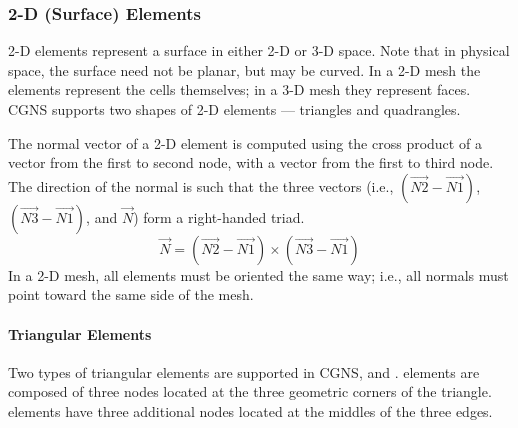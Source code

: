 {{{\subsubsection{2-D (Surface) Elements}
\label{s:unstructgrid_2d}

2-D elements represent a surface in either 2-D or 3-D space.
Note that in physical space, the surface need not be planar, but
may be curved.
In a 2-D mesh the elements represent the cells themselves; in a 3-D
mesh they represent faces.
CGNS supports two shapes of 2-D elements --- triangles and quadrangles.

The normal vector of a 2-D element is computed using the cross product
of a vector from the first to second node, with a vector from the first
to third node.
The direction of the normal is such that the three
vectors (i.e., $(\overrightarrow{N2} - \overrightarrow{N1})$, 
$(\overrightarrow{N3} - \overrightarrow{N1})$, and $\overrightarrow{N}$)
form a right-handed triad.
$$
\overrightarrow{N} = (\overrightarrow{N2} - \overrightarrow{N1}) \times
                     (\overrightarrow{N3} - \overrightarrow{N1})
$$
In a 2-D mesh, all elements must be oriented the same way; i.e., all
normals must point toward the same side of the mesh.

\paragraph{Triangular Elements}
Two types of triangular elements are supported in CGNS, 
and .
 elements are composed of three nodes located at the
three geometric corners of the triangle.
 elements have three additional nodes located at the
middles of the three edges.

}}}
